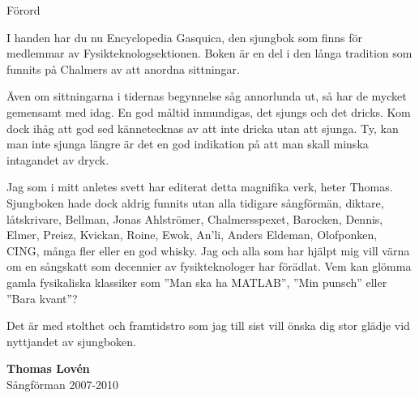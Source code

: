 \begin{flushleft}
{\Huge Förord\\}
\end{flushleft}

{\large
I handen har du nu Encyclopedia Gasquica, den sjungbok som finns för medlemmar av Fysikteknologsektionen.
Boken är en del i den långa tradition som funnits på Chalmers av att anordna sittningar.

Även om sittningarna i tidernas begynnelse såg annorlunda ut, så har de mycket gemensamt med idag.
En god måltid inmundigas, det sjungs och det dricks.
Kom dock ihåg att god sed kännetecknas av att inte dricka utan att sjunga.
Ty, kan man inte sjunga längre är det en god indikation på att man skall minska intagandet av dryck.

Jag som i mitt anletes svett har editerat detta magnifika verk, heter Thomas.
Sjungboken hade dock aldrig funnits utan alla tidigare sångförmän, diktare, låtskrivare, Bellman, Jonas Ahlströmer, Chalmersspexet, Barocken,
Dennis, Elmer, Preisz, Kvickan, Roine, Ewok, An'li, Anders Eldeman, Olofponken,\\
CING, många fler eller en god whisky.
Jag och alla som har hjälpt mig vill värna om en sångskatt som decennier av fysikteknologer har förädlat.
Vem kan glömma gamla fysikaliska klassiker som ''Man ska ha MATLAB'', ''Min punsch'' eller ''Bara kvant''?

Det är med stolthet och framtidstro som jag till sist vill önska dig stor glädje vid nyttjandet av sjungboken.

\vspace{0.5cm}
\begin{flushright}
\textbf{Thomas Lovén}\\
Sångförman 2007-2010
\end{flushright}
}

\newpage

